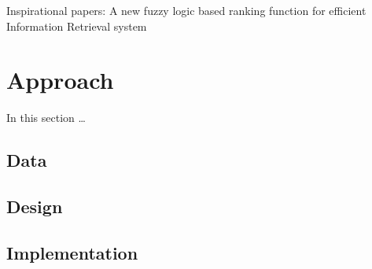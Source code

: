 \documentclass[a4paper]{article}
\begin{document}
Inspirational papers: A new fuzzy logic based ranking function for efficient Information Retrieval system


\section{Approach}
In this section \dots

  \subsection{Data}
  \lipsum[3]


  \subsection{Design}
  \lipsum[2]


  \subsection{Implementation}
  \lipsum[1]
\end{document}
